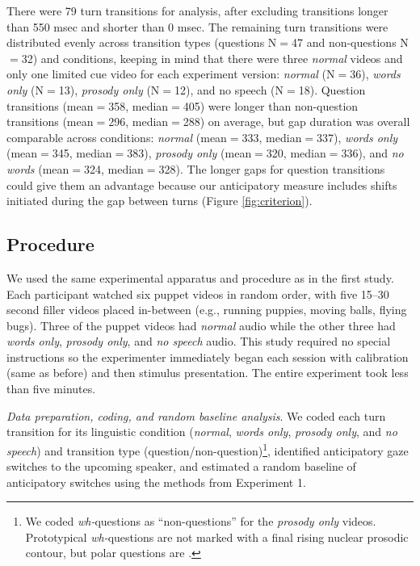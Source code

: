 \documentclass[authoryear, 12pt]{elsarticle}
\begin{document}
There were 79 turn transitions for analysis, after excluding transitions longer than 550 msec and shorter than 0 msec. The remaining turn transitions were distributed evenly across transition types (questions N$=$47 and non-questions N$=$32) and conditions, keeping in mind that there were three \textit{normal} videos and only one limited cue video for each experiment version: \textit{normal} (N$=$36), \textit{words only} (N$=$13), \textit{prosody only} (N$=$12), and {no speech} (N$=$18). Question transitions (mean$=$358, median$=$405) were longer than non-question transitions (mean$=$296, median$=$288) on average, but gap duration was overall comparable across conditions: \textit{normal} (mean$=$333, median$=$337), \textit{words only} (mean$=$345, median$=$383), \textit{prosody only} (mean$=$320, median$=$336), and \textit{no words} (mean$=$324, median$=$328). The longer gaps for question transitions could give them an advantage because our anticipatory measure includes shifts initiated during the gap between turns (Figure \ref{fig:criterion}).

\subsection{Procedure}
We used the same experimental apparatus and procedure as in the first study. Each participant watched six puppet videos in random order, with five 15--30 second filler videos placed in-between (e.g., running puppies, moving balls, flying bugs). Three of the puppet videos had \textit{normal} audio while the other three had \textit{words only}, \textit{prosody only}, and \textit{no speech} audio. This study required no special instructions so the experimenter immediately began each session with calibration (same as before) and then stimulus presentation. The entire experiment took less than five minutes.

\textit{Data preparation, coding, and random baseline analysis}. We coded each turn transition for its linguistic condition (\textit{normal}, \textit{words only}, \textit{prosody only}, and \textit{no speech}) and transition type (question/non-question)\footnote{We coded \textit{wh-}questions as ``non-questions'' for the \textit{prosody only} videos. Prototypical \textit{wh-}questions are not marked with a final rising nuclear prosodic contour, but polar questions are \citep{hedberg2010}.}, identified anticipatory gaze switches to the upcoming speaker, and estimated a random baseline of anticipatory switches using the methods from Experiment 1.
\end{document}
